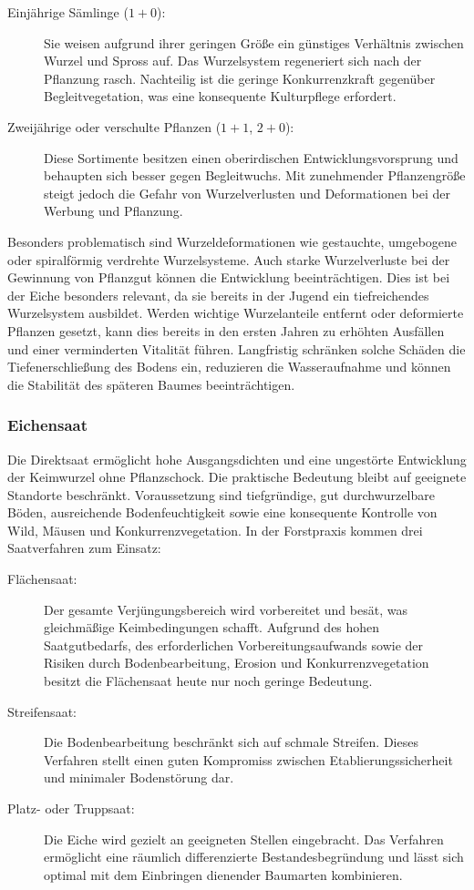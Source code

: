 \documentclass[twocolumn, bibliography=totoc, abstract=true]{scrartcl}
\begin{document}
\begin{description}
\item[Einjährige Sämlinge ($1+0$):] Sie weisen aufgrund ihrer geringen Größe ein günstiges Verhältnis zwischen Wurzel und Spross auf. Das Wurzelsystem regeneriert sich nach der Pflanzung rasch. Nachteilig ist die geringe Konkurrenzkraft gegenüber Begleitvegetation, was eine konsequente Kulturpflege erfordert.
\item[Zweijährige oder verschulte Pflanzen ($1+1$, $2+0$):] Diese Sortimente besitzen einen oberirdischen Entwicklungsvorsprung und behaupten sich besser gegen Begleitwuchs. Mit zunehmender Pflanzengröße steigt jedoch die Gefahr von Wurzelverlusten und Deformationen bei der Werbung und Pflanzung.
\end{description}

Besonders problematisch sind Wurzeldeformationen wie gestauchte, umgebogene oder spiralförmig verdrehte Wurzelsysteme. Auch starke Wurzelverluste bei der Gewinnung von Pflanzgut können die Entwicklung beeinträchtigen. Dies ist bei der Eiche besonders relevant, da sie bereits in der Jugend ein tiefreichendes Wurzelsystem ausbildet. Werden wichtige Wurzelanteile entfernt oder deformierte Pflanzen gesetzt, kann dies bereits in den ersten Jahren zu erhöhten Ausfällen und einer verminderten Vitalität führen. Langfristig schränken solche Schäden die Tiefenerschließung des Bodens ein, reduzieren die Wasseraufnahme und können die Stabilität des späteren Baumes beeinträchtigen.

\subsubsection{Eichensaat}

Die Direktsaat ermöglicht hohe Ausgangsdichten und eine ungestörte Entwicklung der Keimwurzel ohne Pflanzschock. Die praktische Bedeutung bleibt auf geeignete Standorte beschränkt. Voraussetzung sind tiefgründige, gut durchwurzelbare Böden, ausreichende Bodenfeuchtigkeit sowie eine konsequente Kontrolle von Wild, Mäusen und Konkurrenzvegetation. In der Forstpraxis kommen drei Saatverfahren zum Einsatz:

\begin{description}
\item[Flächensaat:] Der gesamte Verjüngungsbereich wird vorbereitet und besät, was gleichmäßige Keimbedingungen schafft. Aufgrund des hohen Saatgutbedarfs, des erforderlichen Vorbereitungsaufwands sowie der Risiken durch Bodenbearbeitung, Erosion und Konkurrenzvegetation besitzt die Flächensaat heute nur noch geringe Bedeutung.
\item[Streifensaat:] Die Bodenbearbeitung beschränkt sich auf schmale Streifen. Dieses Verfahren stellt einen guten Kompromiss zwischen Etablierungssicherheit und minimaler Bodenstörung dar.
\item[Platz- oder Truppsaat:] Die Eiche wird gezielt an geeigneten Stellen eingebracht. Das Verfahren ermöglicht eine räumlich differenzierte Bestandesbegründung und lässt sich optimal mit dem Einbringen dienender Baumarten kombinieren.
\end{description}
\end{document}
